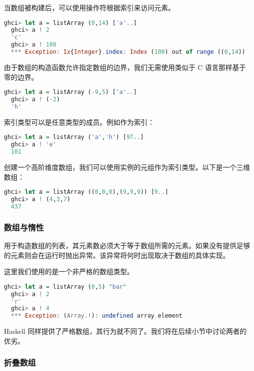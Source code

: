 \documentclass[./main.tex]{subfiles}
\begin{document}
当数组被构建后，可以使用\acode{(!)}操作符根据索引来访问元素。

\begin{lstlisting}[language=Haskell]
  ghci> let a = listArray (0,14) ['a'..]
  ghci> a ! 2
  'c'
  ghci> a ! 100
  *** Exception: Ix{Integer}.index: Index (100) out of range ((0,14))
\end{lstlisting}

由于数组的构造函数允许指定数组的边界，我们无需使用类似于 C 语言那样基于零的边界。

\begin{lstlisting}[language=Haskell]
  ghci> let a = listArray (-9,5) ['a'..]
  ghci> a ! (-2)
  'h'
\end{lstlisting}

索引类型可以是任意类型的成员。例如作为索引：

\begin{lstlisting}[language=Haskell]
  ghci> let a = listArray ('a','h') [97..]
  ghci> a ! 'e'
  101
\end{lstlisting}

创建一个高阶维度数组，我们可以使用实例的元组作为索引类型。以下是一个三维数组：

\begin{lstlisting}[language=Haskell]
  ghci> let a = listArray ((0,0,0),(9,9,9)) [0..]
  ghci> a ! (4,3,7)
  437
\end{lstlisting}

\subsubsection*{数组与惰性}

用于构造数组的列表，其元素数必须大于等于数组所需的元素。如果没有提供足够的元素则会在运行时抛出异常。该异常将何时出现取决于数组的具体实现。

这里我们使用的是一个非严格的数组类型。

\begin{lstlisting}[language=Haskell]
  ghci> let a = listArray (0,5) "bar"
  ghci> a ! 2
  'r'
  ghci> a ! 4
  *** Exception: (Array.!): undefined array element
\end{lstlisting}

Haskell 同样提供了严格数组，其行为就不同了。我们将在后续小节中讨论两者的优劣。

\subsubsection*{折叠数组}
\end{document}
